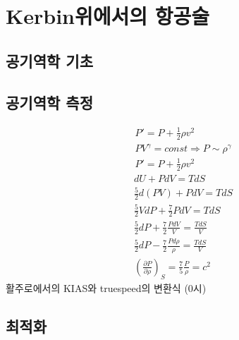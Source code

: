 \part{Kerbin위에서의 항공술}
\chapter{공기역학 기초}
\chapter{공기역학 측정}
\begin{align}
P'= P + \frac{1}{2} \rho v^2
\\
PV^\gamma=const \Rightarrow P \sim \rho^\gamma
\\
P'= P + \frac{1}{2} \rho v^2
\end{align}
\begin{align}
	dU +PdV = TdS
	\\ \frac{5}{2}d(PV) + PdV = TdS
	\\ \frac{5}{2} VdP + \frac{7}{2} PdV = TdS 
	\\ \frac{5}{2} dP + \frac{7}{2} \frac{PdV}{V} =\frac{TdS}{V} 
	\\ \frac{5}{2} dP -\frac{7}{2} \frac{Pd\rho}{\rho} =\frac{TdS}{V} 
	\\ \left(\frac{\partial P}{\partial\rho}\right)_S = \frac{7}{5}\frac{P}{\rho} = c^2
\end{align}
활주로에서의 KIAS와 truespeed의 변환식 (0시)
\chapter{최적화}